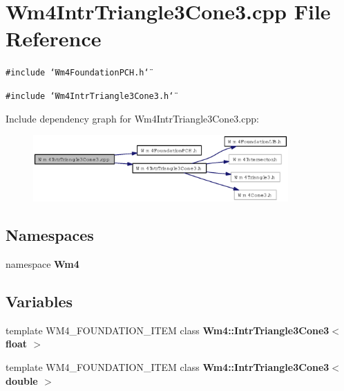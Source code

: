 \section{Wm4Intr\-Triangle3Cone3.cpp File Reference}
\label{Wm4IntrTriangle3Cone3_8cpp}
{\tt \#include \char`\"{}Wm4Foundation\-PCH.h\char`\"{}}\par
{\tt \#include \char`\"{}Wm4Intr\-Triangle3Cone3.h\char`\"{}}\par


Include dependency graph for Wm4Intr\-Triangle3Cone3.cpp:\begin{figure}[H]
\begin{center}
\leavevmode
\includegraphics[width=277pt]{Wm4IntrTriangle3Cone3_8cpp__incl}
\end{center}
\end{figure}
\subsection*{Namespaces}
\begin{CompactItemize}
\item 
namespace {\bf Wm4}
\end{CompactItemize}
\subsection*{Variables}
\begin{CompactItemize}
\item 
template WM4\_\-FOUNDATION\_\-ITEM class {\bf Wm4::Intr\-Triangle3Cone3$<$ float $>$}
\item 
template WM4\_\-FOUNDATION\_\-ITEM class {\bf Wm4::Intr\-Triangle3Cone3$<$ double $>$}
\end{CompactItemize}
